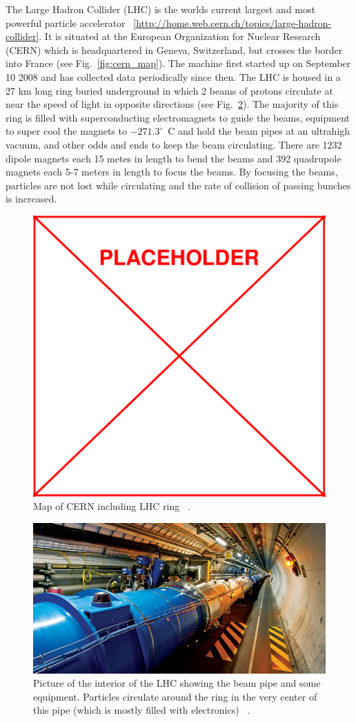 	The Large Hadron Collider (LHC) is the worlds current largest and most powerful particle accelerator ~\ref{http://home.web.cern.ch/topics/large-hadron-collider}. It is situated at the European Organization for Nuclear Research (CERN) which is headquartered in Geneva, Switzerland, but crosses the border into France (see Fig.~\ref{fig:cern_map}). The machine first started up on September 10 2008 and has collected data periodically since then. The LHC is housed in a 27 km long ring buried underground in which 2 beams of protons circulate at near the speed of light in opposite directions (see Fig.~\ref{fig:lhc_beampipe}). The majority of this ring is filled with superconducting electromagnets to guide the beams, equipment to super cool the magnets to $-271.3^\circ$~C and hold the beam pipes at an ultrahigh vacuum, and other odds and ends to keep the beam circulating. There are 1232 dipole magnets each 15 metes in length to bend the beams and 392 quadrupole magnets  each 5-7 meters in length to focus the beams. By focusing the beams, particles are not lost while circulating and the rate of collision of passing bunches is increased.
	
				\begin{figure}[h]
\begin{center}
\includegraphics[width=0.48\linewidth]{Figs/placeholder.pdf}
\caption{\label{fig:lhc_beampipe}
Map of CERN including LHC ring ~\cite{}.
}
\end{center}
\end{figure} 
	
			\begin{figure}[h]
\begin{center}
\includegraphics[width=0.48\linewidth]{Figs/lhc_beampipe.jpg}
\caption{\label{fig:lhc_beampipe}
Picture of the interior of the LHC showing the beam pipe and some equipment. Particles circulate around the ring in the very center of this pipe (which is mostly filled with electronics) ~\cite{http://home.web.cern.ch/topics/large-hadron-collider}.
}
\end{center}
\end{figure} 
			
